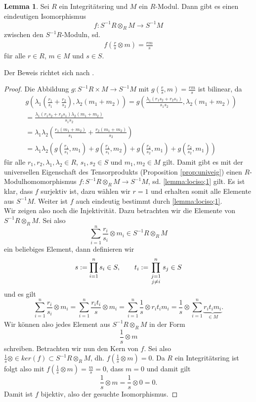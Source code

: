 \documentclass[11pt,titlepage]{article}
\theoremstyle{definition}
\newtheorem{lemma}[theorem]{Lemma}
\theoremstyle{remark}
\begin{document}
	\begin{lemma} \label{lemma:lociso}
		Sei $R$ ein Integritätsring und $M$ ein $R$-Modul. Dann gibt es einen 
		eindeutigen Isomorphismus
		\[f:S^{-1}R\otimes_R M\to S^{-1}M\]
		zwischen den $S^{-1}R$-Moduln, sd.
		\begin{align}
			f\left(\frac{r}{s}\otimes m\right)=\frac{rm}{s} \label{lemma:lociso;1}
		\end{align}
		für alle $r\in R$, $m\in M$ und $s\in S$.
	\end{lemma}
	
	Der Beweis richtet sich nach \cite[Proposition 3.5]{introductiontocomalg}.
	
	\begin{proof}
		Die Abbildung $g:S^{-1}R\times M\to S^{-1}M$ mit $g\left(\frac{r}{s},m\right)=\frac{rm}{s}$ ist bilinear, da 
		\begin{align*}
			&g\left(\lambda_1\left(\frac{r_1}{s_1}+\frac{r_2}{s_2}\right),
			\lambda_2 (m_1+m_2)\right)=g\left(\frac{\lambda_1 (r_1 s_2+r_2
			 s_1)}{s_1s_2},\lambda_2(m_1+m_2)\right) \\
			&=\frac{\lambda_1(r_1s_2+r_2s_1)\lambda_2(m_1+m_2)}{s_1s_2}\\
			&=\lambda_1\lambda_2\left(\frac{r_1(m_1+m_2)}{s_1}+
			\frac{r_2(m_1+m_2)}{s_2}\right) \\
			&=\lambda_1\lambda_2 \left(g\left(\frac{r_1}{s_1},m_1\right)
			+g\left(\frac{r_1}{s_1},m_2\right)+g\left(\frac{r_2}{s_2},m_1\right)+
			g\left(\frac{r_2}{s_2},m_1\right)\right)
		\end{align*}
		für alle $r_1,r_2,\lambda_1,\lambda_2\in R$, $s_1,s_2 \in S$ und 
		$m_1,m_2\in M$ gilt. Damit gibt es mit der universellen Eigenschaft 
		des Tensorprodukts (Proposition \ref{prop:univeig}) einen 
		$R$-Modulhomomorphismus $f:S^{-1}R\otimes_R M\to S^{-1}M$, sd. 
		\ref{lemma:lociso;1} gilt. Es ist klar, dass $f$ surjektiv ist, 
		dazu wählen wir $r=1$ und erhalten somit alle Elemente aus 
		$S^{-1}M$. Weiter ist $f$ auch eindeutig bestimmt durch 
		\ref{lemma:lociso;1}. \\
		Wir zeigen also noch die Injektivität. Dazu betrachten wir die 
		Elemente von $S^{-1}R\otimes_R M$. Sei also 
		\[\sum_{i=1}^n \frac{r_i}{s_i}\otimes m_i \in S^{-1}R\otimes_R M\]
		ein beliebiges Element, dann definieren wir
		\[s:=\prod_{i=1}^n s_i\in S,\qquad t_i:=\prod_{\genfrac{}{}{0pt}{1}{j=1}{j\neq i}}^n s_j\in S\]
		und es gilt 
		\[\sum_{i=1}^n \frac{r_i}{s_i}\otimes m_i =
		\sum_{i=1}^n \frac{r_it_i}{s}\otimes m_i =\sum_{i=1}^n 
		\frac{1}{s}\otimes r_i t_i m_i =\frac{1}{s}\otimes\sum_{i=1}^n
		\underbrace{r_it_im_i}_{\in M}.\]
		Wir können also jedes Element aus $S^{-1}R\otimes_R M$ in der Form 
		\[\frac{1}{s}\otimes m\]
		schreiben. Betrachten wir nun den Kern von $f$. Sei also 
		$\frac{1}{s}\otimes \in ker(f)\subset S^{-1}R\otimes_R M$, dh. 
		$f\left(\frac{1}{s}\otimes m\right)=0$. Da $R$ ein 
		Integritätsring ist folgt also mit $f\left(\frac{1}{s}\otimes m\right)=\frac{m}{s}=0$, dass $m=0$ und damit gilt
		\[\frac{1}{s}\otimes m =\frac{1}{s}\otimes 0=0.\]
		Damit ist $f$ bijektiv, also der gesuchte Isomorphismus.
	\end{proof}
	
\end{document}
